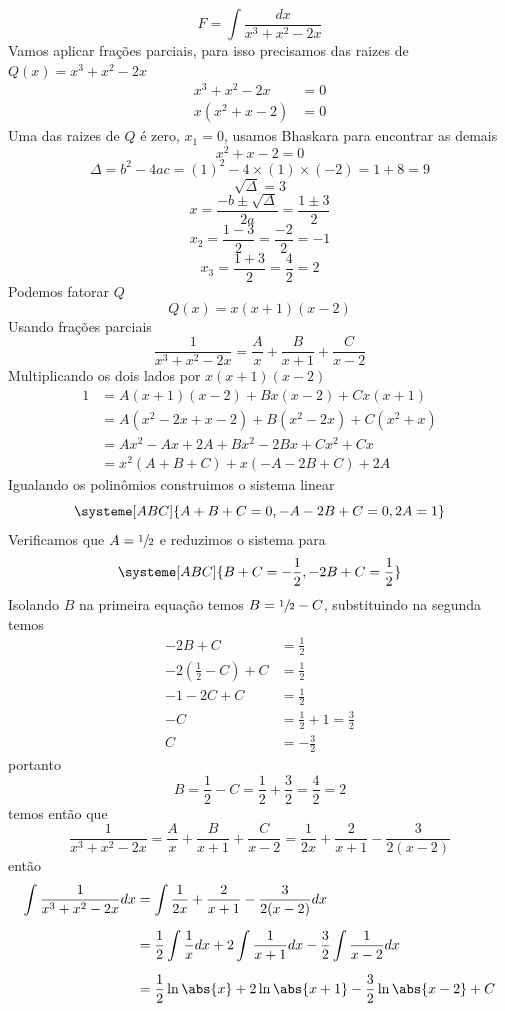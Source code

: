 \documentclass[a4paper,12pt,fleqn]{article}
\begin{document}
\begin{answer}
  \[
    F = \int \frac{dx}{x^3 + x^2 - 2x}
  \]
  Vamos aplicar frações parciais, para isso precisamos das raizes de \(Q(x)=x^3 + x^2 - 2x\)
  \begin{align*}
    x^3 + x^2 - 2x & = 0 \\
    x(x^2+x-2) & = 0
  \end{align*}
  Uma das raizes de $Q$ é zero, $x_1=0$, usamos Bhaskara para encontrar as demais
  \[
    x^2+x-2 = 0
  \]
  \[
    \Delta
    = b^2 - 4ac
    = (1)^2 - 4\times (1) \times (-2)
    = 1 + 8
    = 9
  \]
  \[
    \sqrt{\Delta} = 3
  \]
  \[
    x
    = \frac{-b\pm\sqrt{\Delta}}{2a}
    = \frac{1\pm 3}{2}
  \]
  \[
    x_2
    = \frac{1-3}{2}
    = \frac{-2}{2}
    = -1
  \]
  \[
    x_3
    = \frac{1+3}{2}
    = \frac{4}{2}
    = 2
  \]
  Podemos fatorar $Q$
  \[
    Q(x) = x(x+1)(x-2)
  \]
  Usando frações parciais
  \[
    \frac{1}{x^3 + x^2 - 2x} = \frac{A}{x} + \frac{B}{x+1} + \frac{C}{x-2}
  \]
  Multiplicando os dois lados por \(x(x+1)(x-2)\)
  \begin{align*}
      1
      & = A(x+1)(x-2) + Bx(x-2) + Cx(x+1) \\
      & = A(x^2 -2x + x -2) + B(x^2 -2x) + C(x^2+x) \\
      & = Ax^2 -Ax + 2A + Bx^2 -2Bx + Cx^2 + Cx \\
      & = x^2(A+B+C) + x(-A-2B+ C) + 2A
    \end{align*}
  Igualando os polinômios construimos o sistema linear
  \[
  \systeme[ABC]{
       A +B + C = 0,
      -A -2B +C = 0,
      2A        = 1
    }
  \]
  Verificamos que \(A=\sfrac{1}{2}\) e reduzimos o sistema para
  \[
  \systeme[ABC]{
      B +  C =  -\frac{1}{2},
      -2B + C = \frac{1}{2}
    }
  \]
  Isolando $B$ na primeira equação temos $B=\sfrac{1}{2}-C$, substituindo na segunda temos
  \begin{align*}
    -2B + C                          & = \frac{1}{2}    \\[2mm]
    -2\left(\frac{1}{2}-C\right) + C & = \frac{1}{2}    \\[2mm]
    -1 -2C + C                       & = \frac{1}{2}    \\[2mm]
    -C                               & = \frac{1}{2}+ 1 = \frac{3}{2}    \\[2mm]
    C                                & = -\frac{3}{2}
  \end{align*}
  portanto
  \[
    B
    = \frac{1}{2} - C
    = \frac{1}{2} + \frac{3}{2}
    = \frac{4}{2}
    = 2
  \]
  temos então que
  \[
    \frac{1}{{x^3 + x^2 - 2x}}
    = \frac{A}{x} + \frac{B}{x+1} + \frac{C}{x-2}
    = \frac{1}{2x} + \frac{2}{x+1} - \frac{3}{2(x-2)}
  \]
  então
  \begin{align*}
      \int \frac{1}{{x^3 + x^2 - 2x}} dx
      & = \int \frac{1}{2x} + \frac{2}{x+1} - \frac{3}{2(x-2)} dx \\[2mm]
      & = \frac{1}{2} \int \frac{1}{x} dx
        + 2\int \frac{1}{x+1} dx
        - \frac{3}{2} \int \frac{1}{x-2} dx \\[2mm]
      & = \frac{1}{2}\ln\abs{x} + 2\ln\abs{x+1} - \frac{3}{2}\ln\abs{x-2} + C
    \end{align*}
  \clearpage
\end{answer}
\end{document}
